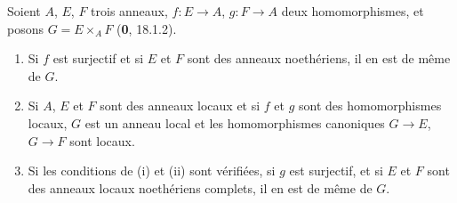 \begin{lemma}[19.3.2.1]
\label{IV.19.3.2.1}
Soient $A$, $E$, $F$ trois anneaux, $f:E\to A$, $g:F\to A$ deux homomorphismes, et posons $G=E\times_A F$ \textup{(\textbf{0}, 18.1.2)}.
\begin{enumerate}
  \item[\textup{(i)}] Si $f$ est surjectif et si $E$ et $F$ sont des anneaux noethériens, il en est de même de $G$.
  \item[\textup{(ii)}] Si $A$, $E$ et $F$ sont des anneaux locaux et si $f$ et $g$ sont des homomorphismes locaux, $G$ est un anneau local et les homomorphismes canoniques $G\to E$, $G\to F$ sont locaux.
  \item[\textup{(iii)}] Si les conditions de \textup{(i)} et \textup{(ii)} sont vérifiées, si $g$ est surjectif, et si $E$ et $F$ sont des anneaux locaux noethériens complets, il en est de même de $G$.
\end{enumerate}
\end{lemma}

